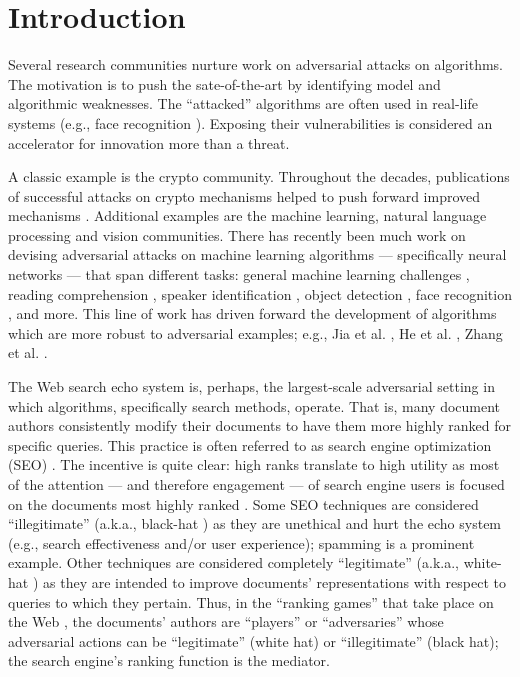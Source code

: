 \section{Introduction}
\label{sec:intro}
Several research communities nurture work on adversarial attacks
on algorithms. The motivation is to push the sate-of-the-art by
identifying model and algorithmic weaknesses. The ``attacked''
algorithms are often used in real-life systems (e.g., face
recognition \cite{Dong+al:19a}). Exposing their vulnerabilities is considered an accelerator for innovation more than
a threat.

A classic example is the crypto community. Throughout the decades,
publications of successful attacks on crypto mechanisms helped to push
forward improved mechanisms \cite{Boneh:99a}. Additional examples are the
machine learning, natural language
processing and vision communities. There has recently
been much work on devising adversarial attacks on machine learning
algorithms --- specifically neural networks --- that span different
tasks: general machine learning challenges
\cite{Szegedy+al:14a,Huang+al:17a,Papernot+al:17a}, reading
comprehension \cite{Jia+Liang:17a}, speaker identification
\cite{Kreuk+al:18a}, object detection \cite{Xie+al:17a}, face
recognition \cite{Dong+al:19a}, and more. This line of work has
driven forward the development of algorithms which are more robust to
adversarial examples; e.g., Jia et al. \cite{Jia+al:19a}, He et al. \cite{He+al:17a}, Zhang et
al. \cite{Zhang+al:19a}.

The Web search echo system is, perhaps, the largest-scale adversarial
setting in which algorithms, specifically search methods,
operate. That is, many document authors consistently modify their
documents to have them more highly ranked for specific queries.  This
practice is often referred to as search engine optimization (SEO)
\cite{Gyongyi+Molina:05a}.  The incentive is quite clear: high ranks
translate to high utility as most of the attention --- and therefore
engagement --- of search engine users is focused on the documents most
highly ranked \cite{Joachims+al:05a}. Some SEO techniques are
considered ``illegitimate'' (a.k.a., black-hat
\cite{Gyongyi+Molina:05a}) as they are unethical and hurt the echo system (e.g., search effectiveness and/or user experience); spamming is a prominent
example. Other techniques are considered completely ``legitimate''
(a.k.a., white-hat \cite{Gyongyi+Molina:05a}) as they are intended to
improve documents' representations with respect to queries to which
they pertain. Thus, in the ``ranking games'' that take place on the
Web \cite{Tennenholtz+Kurland:19a}, the documents' authors are
``players'' or ``adversaries'' whose adversarial actions can be
``legitimate'' (white hat) or ``illegitimate'' (black hat); the
search engine's ranking function is the mediator.

